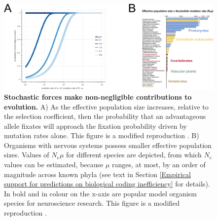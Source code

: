 \documentclass[twocolumn]{article}
\begin{document}
\begin{figure}[htp]
\centering
\includegraphics[width=17 cm]{fig_2.png}
\caption{\textbf{Stochastic forces make non-negligible contributions to evolution.} A) As the effective population size increases, relative to the selection coefficient, then the probability that an advantageous allele fixates will approach the fixation probability driven by mutation rates alone. This figure is a modified reproduction \cite{Lynch_2007}. B) Organisms with nervous systems possess smaller effective population sizes. Values of $N_e\mu$ for different species are depicted, from which $N_e$ values can be estimated, because $\mu$ ranges, at most, by an order of magnitude across known phyla (see text in Section \ref{Empirical support for predictions on biological coding inefficiency} for details). In bold and in colour on the x-axis are popular model organism species for neuroscience research. This figure is a modified reproduction \cite{Lynch_Conery_2003}.}
\label{fig_neutralforces}
\end{figure}
\end{document}
